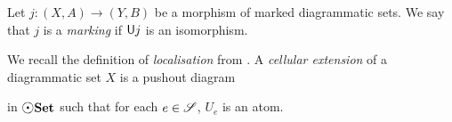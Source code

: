 \begin{dfn} [Marking]
   Let \( j \colon (X, A) \to (Y, B) \) be a morphism of marked diagrammatic sets. 
   We say that \( j \) is a \emph{marking} if \( \mathsf{U}j \) is an isomorphism.
\end{dfn}

\begin{dfn} \label{dfn:localisation} 
    We recall the definition of \emph{localisation} from \cite[Section 2.4]{chanavat2024model}.
    A \emph{cellular extension} of a diagrammatic set \( X \) is a pushout diagram
    \begin{center}
    \end{center}
    in \( \dgmSet \) such that for each \( e \in \mathscr{S} \), \( U_e \) is an atom.


\end{dfn}
